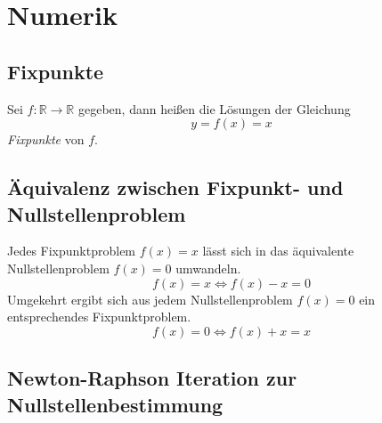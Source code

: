 \section{Numerik}
\label{sec:numerik}

\subsection{Fixpunkte}
\label{sub:fixpunkte}

Sei $f : \mathbb{R} \rightarrow \mathbb{R}$ gegeben, dann heißen die Lösungen der Gleichung 
\begin{equation}
	y = f(x) = x
\end{equation}
\emph{Fixpunkte} von $f$.

\subsection{\"{A}quivalenz zwischen Fixpunkt- und Nullstellenproblem}
\label{sub:aequivalenz_zwischen_fixpunkt_und_nullstellenproblem}

Jedes Fixpunktproblem $f(x) = x$ lässt sich in das äquivalente Nullstellenproblem $f(x) = 0$ umwandeln.
\begin{equation}
	f(x) = x \Leftrightarrow f(x) - x = 0
\end{equation}
Umgekehrt ergibt sich aus jedem Nullstellenproblem $f(x) = 0$ ein entsprechendes Fixpunktproblem.
\begin{equation}
	f(x) = 0 \Leftrightarrow f(x) + x = x
\end{equation}

\subsection{Newton-Raphson Iteration zur Nullstellenbestimmung}
\label{sub:newton_raphson_iteration_zur_nullstellenbestimmung}

